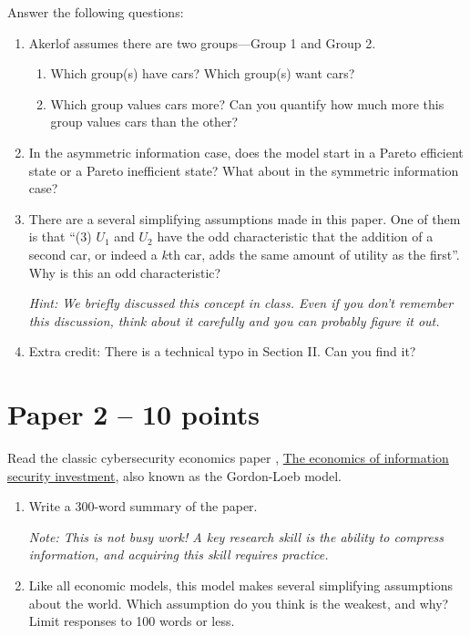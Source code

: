 \documentclass[11pt]{article}
\begin{document}
Answer the following questions:
\begin{enumerate}
    \item Akerlof assumes there are two groups---Group 1 and Group 2. 
    \begin{enumerate}
        \item Which group(s) have cars? Which group(s) want cars?
        \item Which group values cars more? Can you quantify how much more this group values cars than the other?
    \end{enumerate}
    \item In the asymmetric information case, does the model start in a Pareto efficient state or a Pareto inefficient state? What about in the symmetric information case?
    \item There are a several simplifying assumptions made in this paper. One of them is that ``(3) $U_1$ and $U_2$ have the odd characteristic that the addition of a second car, or indeed a $k$th car, adds the same amount of utility as the first''. Why is this an odd characteristic? 
    
    \textit{Hint: We briefly discussed this concept in class. Even if you don't remember this discussion, think about it carefully and you can probably figure it out.}

    \item Extra credit: There is a technical typo in Section II. Can you find it?
\end{enumerate}

\section{Paper 2 -- 10 points}

Read the classic cybersecurity economics paper , \href{https://dl.acm.org/doi/abs/10.1145/581271.581274}{The economics of information security investment}, also known as the Gordon-Loeb model.

\begin{enumerate}
    \item Write a 300-word summary of the paper. 
    
    \textit{Note: This is not busy work! A key research skill is the ability to compress information, and acquiring this skill requires practice.}
    \item Like all economic models, this model makes several simplifying assumptions about the world. Which assumption do you think is the weakest, and why? Limit responses to 100 words or less.
\end{enumerate}
\end{document}
